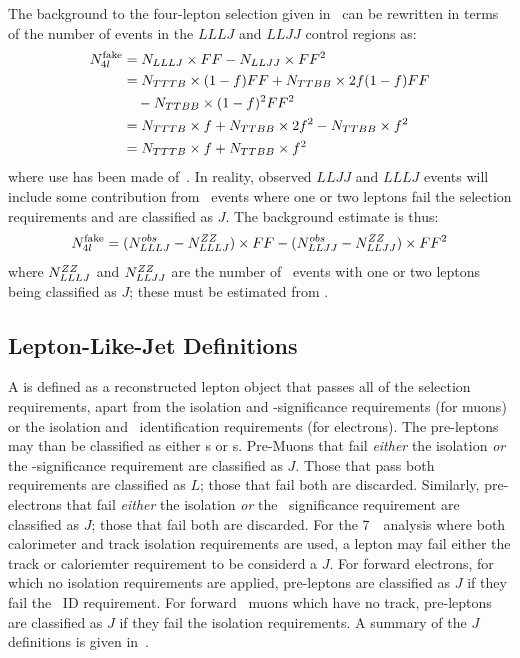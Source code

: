 The background to the four-lepton selection given in~ can 
be rewritten in terms of the number of events in the $LLLJ$ and $LLJJ$ control
regions as:
\begin{align}
N_{4l}^{\rm fake} &= N_{LLLJ} \times FF - N_{LLJJ} \times FF^{2} \notag \\
 &= N_{TTTB} \times (1-f) FF + N_{TTBB} \times 2f (1 - f) FF \notag \\
 &\quad - N_{TTBB} \times (1-f)^{2} FF^{2} \notag \\
 &=  N_{TTTB} \times f + N_{TTBB} \times 2 f^{2} - N_{TTBB} \times f^{2} \notag \\
 &= N_{TTTB} \times f + N_{TTBB} \times f^{2} 
\end{align}
where use has been made of~. In reality, observed
$LLJJ$ and $LLLJ$ events will include some contribution from \ZZllll\ events where
one or two leptons fail the selection requirements and are classified as $J$.
The background estimate is thus:
\begin{equation}
N_{4l}^{\rm fake} = (N^{obs}_{LLLJ} - N^{ZZ}_{LLLJ}) \times FF -
(N^{obs}_{LLJJ} - N^{ZZ}_{LLJJ})\times FF^{2} 
\end{equation}
where $N^{ZZ}_{LLLJ}$ and $N^{ZZ}_{LLJJ}$ are the number of \ZZ\ events with
one or two leptons being classified as $J$; these must be estimated from \mc.

\subsection{Lepton-Like-Jet Definitions}

A  is defined as a reconstructed lepton object that passes all of
the selection requirements, apart from the isolation and \dzero-significance
requirements (for muons) or the isolation and \loosePP\ identification
requirements (for electrons). The pre-leptons may than be classified as either \lljet s or \sellep s.
Pre-Muons that fail {\it either} the isolation {\it or} the
\dzero-significance requirement are classified as $J$. Those that pass both requirements are
classified as $L$; those that fail both are
discarded. Similarly, pre-electrons that fail {\it either} the isolation {\it or} the
\loosePP\ significance requirement are classified as $J$; those that fail both are
discarded. For the 7~\tev\ analysis where both calorimeter and track isolation
requirements are used, a lepton may fail either the track or caloriemter requirement
to be considerd a $J$. For forward electrons, for which no isolation
requirements are applied, pre-leptons are classified as $J$
if they fail the \tight\ ID requirement. For forward \standAlone\ muons which have
no track, pre-leptons are classified as $J$ if they fail the isolation
requirements. A summary of the $J$ definitions is
given in~.

